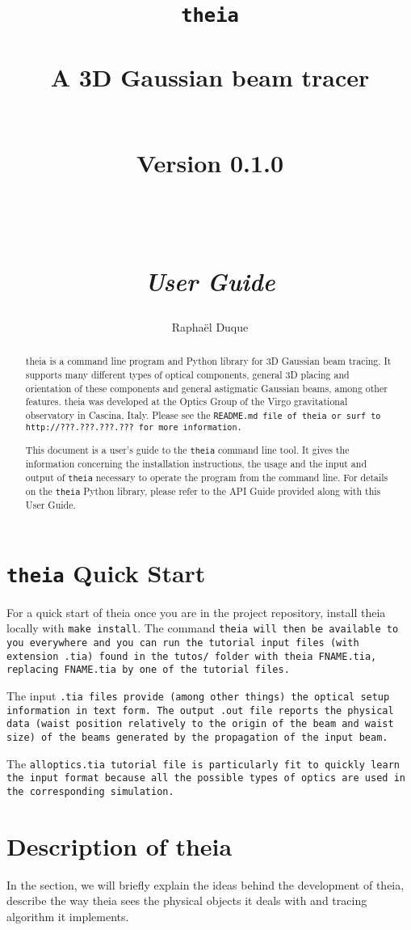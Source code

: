 \documentclass{article}
\title{\texttt{theia} \\ \quad \\A 3D Gaussian beam tracer \\ \quad \\ \begin{small} Version 0.1.0 \end{small} \\ \quad \\ \textit{User Guide}}
\author{Rapha\"el Duque}
\begin{document}
\maketitle

\begin{abstract}
theia is a command line program and Python library for 3D Gaussian beam tracing. It supports many different types of optical components, general 3D placing and orientation of these components and general astigmatic Gaussian beams, among other features. theia was developed at the Optics Group of the Virgo gravitational observatory in Cascina, Italy. Please see the \tt{README.md} file of \tt{theia} or surf to \tt{http://???.???.???.???} for more information.

This document is a user's guide to the \texttt{theia} command line tool. It gives the information concerning the installation instructions, the usage and the input and output of \texttt{theia} necessary to operate the program from the command line. For details on the \texttt{theia} Python library, please refer to the API Guide provided along with this User Guide.
\end{abstract}


\tableofcontents
\newpage

\section{\texttt{theia} Quick Start}
For a quick start of theia once you are in the project repository, install theia locally with \texttt{make install}. The command \tt{theia} will then be available to you everywhere and  you can run the tutorial input files (with extension \texttt{.tia}) found in the \texttt{tutos/} folder with \texttt{theia FNAME.tia}, replacing \texttt{FNAME.tia} by one of the tutorial files.

The input \tt{.tia} files provide (among other things) the optical setup information in text form. The output \tt{.out} file reports the physical data (waist position relatively to the origin of the beam and waist size) of the beams generated by the propagation of the input beam.

The \tt{alloptics.tia} tutorial file is particularly fit to quickly learn the input format because all the possible types of optics are used in the corresponding simulation. 

\section{Description of theia}
In the section, we will briefly explain the ideas behind the development of theia, describe the way theia sees the physical objects it deals with and tracing algorithm it implements.
\end{document}
